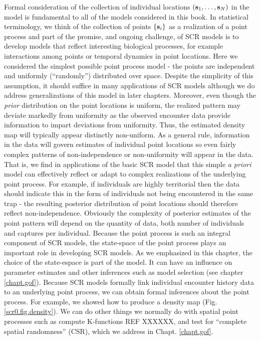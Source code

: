 {{Formal consideration of the collection of individual locations $({\bf
  s}_{1}, \ldots, {\bf s}_{N})$ in the model is fundamental to all of
the models considered in this book. In statistical terminology, we
think of the collection of points $\{ {\bf s}_{i} \}$ as a realization of a
point process and part of the promise, and ongoing challenge, of SCR
models is to develop models that reflect interesting biological
processes, for example interactions among points or temporal dynamics
in point locations.  Here we considered the simplest possible point
process model - the points are independent and uniformly
(``randomly'') distributed over space. Despite the simplicity of this
assumption, it should suffice in many applications of SCR models
although we do address generalizations of this model in later
chapters. Moreover, even though the {\it prior} distribution on the
point locations is uniform, the realized pattern may deviate markedly
from uniformity as the observed encounter data provide information to
impart deviations from uniformity. Thus, the estimated density map
will typically appear distinctly non-uniform.  As a general rule,
information in the data will govern estimates of individual point
locations so even fairly complex patterns of non-independence or
non-uniformity will appear in the data. That is, we find in
applications of the basic SCR model that this simple {\it a priori}
model can effectively reflect or adapt to complex realizations of the
underlying point process.  For example, if individuals are highly
territorial then the data should indicate this in the form of
individuals not being encountered in the same trap - the resulting
posterior distribution of point locations should therefore reflect
non-independence.  Obviously the complexity of posterior estimates of
the point pattern will depend on the quantity of data, both number of
individuals and captures per individual.  Because the point process is
such an integral component of SCR models, the state-space of the point
process plays an important role in developing SCR models. As we 
emphasized in this chapter, the choice of the state-espace is part of
the model. It can have an influence on parameter estimates and other
inferences such as model selection (see chapter \ref{chapt.gof}).
Because SCR models formally link individual encounter history data to
an underlying point process, we can obtain formal inferences about the
point process. For example, we showed how to produce a density
map (Fig. \ref{scr0.fig.density}). We can do
other things we normally do with spatial point processes such as
compute K-functions  REF XXXXXX, and test for 
``complete spatial randomness''
(CSR), which we address in Chapt.  \ref{chapt.gof}. 

}}
